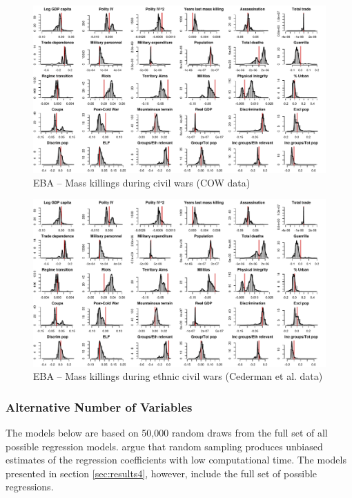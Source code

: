 \clearpage
\begin{figure}
    \centering
    \includegraphics[width=\textwidth]{images/mk-ucdp.pdf}
    \caption{EBA -- Mass killings during civil wars (COW data)}
    \label{fig:mk-cow}
\end{figure}
\clearpage

\clearpage
\begin{figure}
    \centering
    \includegraphics[width=\textwidth]{images/mk-ucdp.pdf}
    \caption{EBA -- Mass killings during ethnic civil wars (Cederman et al. data)}
    \label{fig:mk-eth}
\end{figure}
\clearpage

\subsubsection{Alternative Number of Variables}

The models below are based on 50,000 random draws from the full set of all possible regression models. \citet[819]{salaimartin2004determinants} argue that random sampling produces unbiased estimates of the regression coefficients with low computational time. The models presented in section \ref{sec:results4}, however, include the full set of possible regressions.

